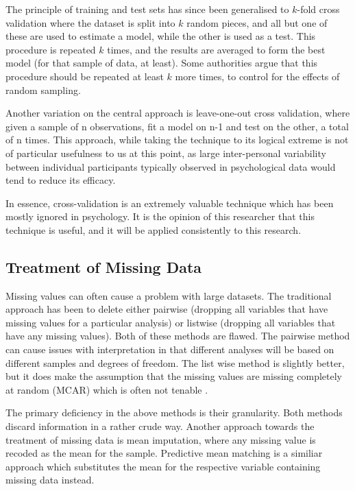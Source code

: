 The principle of training and test sets has since been generalised to $k$-fold cross validation where the dataset is split into $k$ random pieces, and all but one of these are used to estimate a model, while the other is used as a test. This procedure is repeated $k$ times, and the results are averaged to form the best model (for that sample of data, at least). Some authorities argue that this procedure should be repeated at least $k$ more times, to control for the effects of random sampling\cite{friedman2009elements}. 

Another variation on the central approach is leave-one-out cross validation, where given a sample of n observations, fit a model on n-1 and test on the other, a total of n times. This approach, while taking the technique to its logical extreme is not of particular usefulness to us at this point, as large inter-personal variability between individual participants typically observed in psychological data would tend to reduce its efficacy\cite{friedman2009elements}. 

In essence, cross-validation is an extremely valuable technique which has been mostly ignored in psychology. It is the opinion of this researcher  that this technique is useful, and it will be applied consistently to this research. 

\subsection{Treatment of Missing Data}


Missing values can often cause a problem with large datasets. The
traditional approach has been to delete either pairwise (dropping
all variables that have missing values for a particular analysis)
or listwise (dropping all variables that have any missing values).
Both of these methods are flawed. The pairwise method can cause issues
with interpretation in that different analyses will be based on different
samples and degrees of freedom. The list wise method is slightly better,
but it does make the assumption that the missing values are missing
completely at random (MCAR) which is often not tenable \cite{graham2009missing}.

The primary deficiency in the above methods is their granularity. Both methods discard information in a rather crude way. Another approach towards the treatment of missing data is mean imputation, where any missing value is recoded as the mean for the sample. Predictive mean matching is a similiar approach which substitutes the mean for the respective variable containing missing data instead. 

